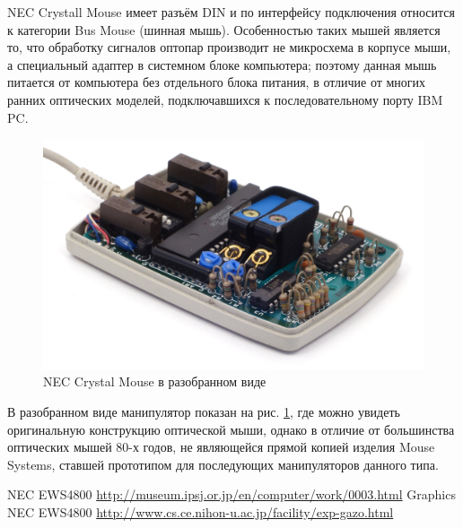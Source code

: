 \documentclass[11pt, a4paper]{article}
\begin{document}
NEC Crystall Mouse имеет разъём DIN и по интерфейсу подключения относится к категории Bus Mouse (шинная мышь). Особенностью таких мышей является то, что обработку сигналов оптопар производит не микросхема в корпусе мыши, а специальный адаптер в системном блоке компьютера; поэтому данная мышь питается от компьютера без отдельного блока питания, в отличие от многих ранних оптических моделей, подключавшихся к последовательному порту IBM PC. 

\begin{figure}[h]
    \centering
    \includegraphics[scale=0.8]{1986_nec_crystal_mouse/necraz_60.jpg}
    \caption{NEC Crystal Mouse в разобранном виде}
    \label{fig:NecCrystalInside}
\end{figure}

В разобранном виде манипулятор показан на рис. \ref{fig:NecCrystalInside}, где можно увидеть оригинальную конструкцию оптической мыши, однако в отличие от большинства оптических мышей 80-х годов, не являющейся прямой копией изделия Mouse Systems, ставшей прототипом для последующих манипуляторов данного типа.
    
\begin{thebibliography}{9}
 NEC EWS4800 \url{http://museum.ipsj.or.jp/en/computer/work/0003.html}
 Graphics NEC EWS4800 \url{http://www.cs.ce.nihon-u.ac.jp/facility/exp-gazo.html}
\end{thebibliography}
\end{document}
